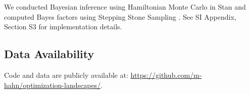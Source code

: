 \documentclass[9pt,twocolumn,twoside,lineno]{pnas-new}
\begin{document}
{We conducted Bayesian inference using Hamiltonian Monte Carlo in Stan \citep{homan2014the,carpenter2017stan} and computed Bayes factors using Stepping Stone Sampling \citep{xie2011improving}.
See SI Appendix, Section S3 for implementation details.


	\subsection*{Data Availability} Code and data are publicly available at:
\url{https://github.com/m-hahn/optimization-landscapes/}.



}

\showmatmethods{} %


\showacknow{} %

%

\end{document}
